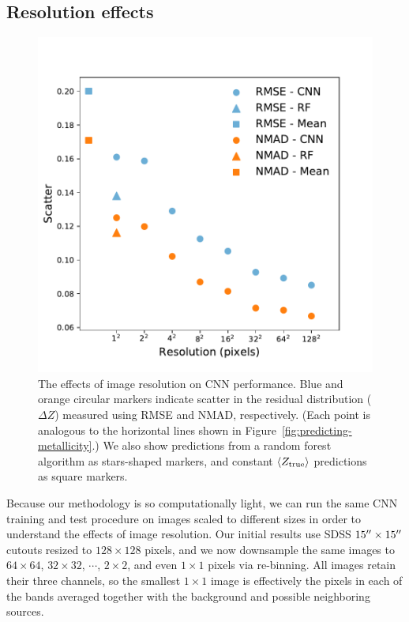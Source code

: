 \documentclass[fleqn,usenatbib]{mnras}
\begin{document}
\subsection{Resolution effects} \label{sec:resolution}

\begin{figure}
	\includegraphics[width=\columnwidth]{04-resolution.pdf}
	\caption{\label{fig:resolution}
		The effects of image resolution on CNN performance. Blue and orange circular markers indicate scatter in the residual distribution ($\Delta Z$) measured using RMSE and NMAD, respectively. (Each point is analogous to the horizontal lines shown in Figure~\ref{fig:predicting-metallicity}.) We also show predictions from a random forest algorithm as stars-shaped markers, and constant $\langle Z_{\rm true}\rangle$ predictions as square markers.}
\end{figure}

Because our methodology is so computationally light, we can run the same CNN training and test procedure on images scaled to different sizes in order to understand the effects of image resolution. Our initial results use SDSS $15\hbox{$^{\prime\prime}$} \times 15 \hbox{$^{\prime\prime}$}$ cutouts resized to $128\times 128$ pixels, and we now downsample the same images to $64\times 64$, $32 \times 32$, $\cdots$, $2\times 2$, and even $1\times 1$ pixels via re-binning. All images retain their three channels, so the smallest $1 \times 1$ image is effectively the pixels in each of the \sdssi\sdssr\sdssg{} bands averaged together with the background and possible neighboring sources.
\end{document}
